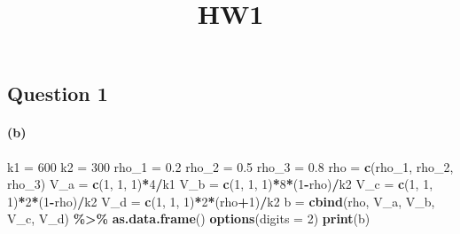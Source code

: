\documentclass[
]{article}
\title{HW1}
\author{}
\date{\vspace{-2.5em}}
\newenvironment{Shaded}{\begin{snugshade}}{\end{snugshade}}
\newcommand{\AttributeTok}[1]{\textcolor[rgb]{0.13,0.29,0.53}{#1}}
\newcommand{\DecValTok}[1]{\textcolor[rgb]{0.00,0.00,0.81}{#1}}
\newcommand{\FloatTok}[1]{\textcolor[rgb]{0.00,0.00,0.81}{#1}}
\newcommand{\FunctionTok}[1]{\textcolor[rgb]{0.13,0.29,0.53}{\textbf{#1}}}
\newcommand{\NormalTok}[1]{#1}
\newcommand{\OtherTok}[1]{\textcolor[rgb]{0.56,0.35,0.01}{#1}}
\newcommand{\SpecialCharTok}[1]{\textcolor[rgb]{0.81,0.36,0.00}{\textbf{#1}}}
\begin{document}
\maketitle

\hypertarget{question-1}{%
\subsection{Question 1}\label{question-1}}

\hypertarget{b}{%
\paragraph{(b)}\label{b}}

\begin{Shaded}
\begin{Highlighting}[]
\NormalTok{k1 }\OtherTok{=} \DecValTok{600}
\NormalTok{k2 }\OtherTok{=} \DecValTok{300}
\NormalTok{rho\_1 }\OtherTok{=} \FloatTok{0.2}
\NormalTok{rho\_2 }\OtherTok{=} \FloatTok{0.5}
\NormalTok{rho\_3 }\OtherTok{=} \FloatTok{0.8}
\NormalTok{rho }\OtherTok{=} \FunctionTok{c}\NormalTok{(rho\_1, rho\_2, rho\_3)}
\NormalTok{V\_a }\OtherTok{=} \FunctionTok{c}\NormalTok{(}\DecValTok{1}\NormalTok{, }\DecValTok{1}\NormalTok{, }\DecValTok{1}\NormalTok{)}\SpecialCharTok{*}\DecValTok{4}\SpecialCharTok{/}\NormalTok{k1}
\NormalTok{V\_b }\OtherTok{=} \FunctionTok{c}\NormalTok{(}\DecValTok{1}\NormalTok{, }\DecValTok{1}\NormalTok{, }\DecValTok{1}\NormalTok{)}\SpecialCharTok{*}\DecValTok{8}\SpecialCharTok{*}\NormalTok{(}\DecValTok{1}\SpecialCharTok{{-}}\NormalTok{rho)}\SpecialCharTok{/}\NormalTok{k2}
\NormalTok{V\_c }\OtherTok{=} \FunctionTok{c}\NormalTok{(}\DecValTok{1}\NormalTok{, }\DecValTok{1}\NormalTok{, }\DecValTok{1}\NormalTok{)}\SpecialCharTok{*}\DecValTok{2}\SpecialCharTok{*}\NormalTok{(}\DecValTok{1}\SpecialCharTok{{-}}\NormalTok{rho)}\SpecialCharTok{/}\NormalTok{k2}
\NormalTok{V\_d }\OtherTok{=} \FunctionTok{c}\NormalTok{(}\DecValTok{1}\NormalTok{, }\DecValTok{1}\NormalTok{, }\DecValTok{1}\NormalTok{)}\SpecialCharTok{*}\DecValTok{2}\SpecialCharTok{*}\NormalTok{(rho}\SpecialCharTok{+}\DecValTok{1}\NormalTok{)}\SpecialCharTok{/}\NormalTok{k2}
\NormalTok{b  }\OtherTok{=} \FunctionTok{cbind}\NormalTok{(rho, V\_a, V\_b, V\_c, V\_d) }\SpecialCharTok{\%\textgreater{}\%} \FunctionTok{as.data.frame}\NormalTok{()}
\FunctionTok{options}\NormalTok{(}\AttributeTok{digits =} \DecValTok{2}\NormalTok{)}
\FunctionTok{print}\NormalTok{(b)}
\end{Highlighting}
\end{Shaded}
\end{document}
